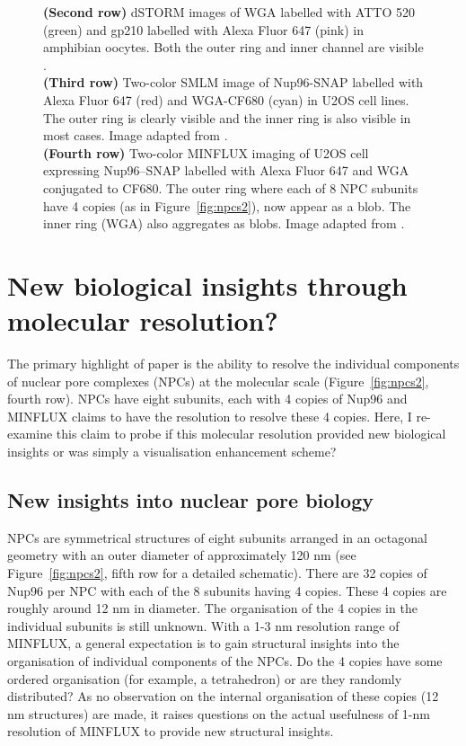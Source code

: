 \documentclass[9pt,twocolumn,twoside]{pnas-new}
\begin{document}
\begin{figure}[h!]
{\textbf{(Second row)} dSTORM images of WGA labelled with ATTO 520 (green) and gp210 labelled with Alexa Fluor 647 (pink) in amphibian oocytes. Both the outer ring and inner channel are visible \citep{loschberger2012super}. \\
\textbf{(Third row)} Two-color SMLM image of Nup96-SNAP labelled with Alexa Fluor 647 (red) and WGA-CF680 (cyan) in U2OS cell lines. The outer ring is clearly visible and the inner ring is also visible in most cases. Image adapted from \cite{thevathasan2019nuclear}. \\
\textbf{(Fourth row)} Two-color MINFLUX imaging of U2OS cell expressing Nup96–SNAP labelled with Alexa Fluor 647 and WGA conjugated to CF680.
The outer ring where each of 8 NPC subunits have 4 copies (as in  Figure~\ref{fig:npcs2}), now appear as a blob. The inner ring (WGA) also aggregates as blobs. Image adapted from \cite{thevathasan2019nuclear}. } \label{fig:npcs3}
\end{figure}


\section{New biological insights through molecular resolution?}

The primary highlight of \cite{gwosch2020minflux} paper is the ability to resolve the individual components of nuclear pore complexes (NPCs) at the molecular scale (Figure~\ref{fig:npcs2}, fourth row). NPCs have eight subunits, each with 4 copies of Nup96 and MINFLUX claims to have  the resolution to resolve these 4 copies. Here, I re-examine this claim to probe if this molecular resolution provided new biological insights or was simply a visualisation enhancement scheme?  

\subsection{New insights into nuclear pore biology}
NPCs are symmetrical structures of eight subunits arranged in an octagonal geometry with an outer diameter of approximately 120 nm (see Figure~\ref{fig:npcs2}, fifth row for a detailed schematic). There are 32 copies of Nup96 per NPC with each of the 8 subunits having 4 copies. These 4 copies are roughly around 12 nm in diameter. The organisation of the 4 copies in the individual subunits is still unknown. With a 1-3 nm resolution range of MINFLUX, a general expectation is to gain structural insights into the organisation of individual components of the NPCs. Do the 4 copies have some ordered organisation (for example, a tetrahedron) or are they randomly distributed? As no observation on the internal organisation of these copies (12 nm structures) are made, it raises questions on the actual usefulness of 1-nm resolution of MINFLUX to provide new structural insights. 
\end{document}
